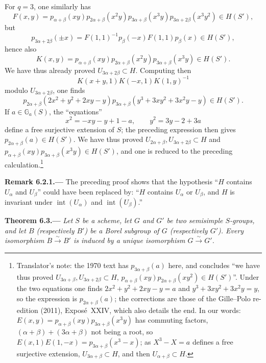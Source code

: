 For \(q=3\), one similarly has
\[
 F(x,y)=
 p_{\alpha+\beta}(xy)
 p_{2\alpha+\beta}(x^2y)
 p_{3\alpha+\beta}(x^3y)
 p_{3\alpha+2\beta}(x^3y^2)\in H(S'),
\]
but
\[
 p_{3\alpha+2\beta}(\pm x)
 =F(1,1)^{-1}p_\beta(-x)F(1,1)p_\beta(x)\in H(S'),
\]
hence also
\[
 K(x,y)=
 p_{\alpha+\beta}(xy)
 p_{2\alpha+\beta}(x^2y)
 p_{3\alpha+\beta}(x^3y)\in H(S').
\]
We have thus already proved \(U_{3\alpha+2\beta}\subset H\). Computing then
\[
 K(x+y,1)K(-x,1)K(1,y)^{-1}
\]
modulo \(U_{3\alpha+2\beta}\), one finds
\[
 p_{2\alpha+\beta}(2x^2+y^2+2xy-y)
 p_{3\alpha+\beta}(y^3+3xy^2+3x^2y-y)\in H(S').
\]
If \(a\in\mathbb G_a(S)\), the ``equations''
\[
  x^2=-xy-y+1-a,\qquad
  y^2=3y-2+3a
\]
define a free surjective extension of \(S\); the preceding expression then gives
\(p_{2\alpha+\beta}(a)\in H(S')\). We have thus proved \(U_{2\alpha+\beta},U_{3\alpha+2\beta}\subset H\)
and \(p_{\alpha+\beta}(xy)p_{3\alpha+\beta}(x^3y)\in H(S')\), and one is reduced to the preceding
calculation.\footnote{Translator's note: the 1970 text has \(p_{3\alpha+\beta}(a)\) here, and
concludes ``we have thus proved \(U_{3\alpha+\beta},U_{3\alpha+2\beta}\subset H\),
\(p_{\alpha+\beta}(xy)p_{2\alpha+\beta}(xy^2)\in H(S')\)''. Under the two equations one finds
\(2x^2+y^2+2xy-y=a\) and \(y^3+3xy^2+3x^2y=y\), so the expression is
\(p_{2\alpha+\beta}(a)\); the corrections are those of the Gille--Polo re-edition (2011),
Exposé~XXIV, which also details the end. In our words: \(E(x,y)=p_{\alpha+\beta}(xy)p_{3\alpha+\beta}(x^3y)\)
has commuting factors, \((\alpha+\beta)+(3\alpha+\beta)\) not being a root, so
\(E(x,1)E(1,-x)=p_{3\alpha+\beta}(x^3-x)\); as \(X^3-X=a\) defines a free surjective extension,
\(U_{3\alpha+\beta}\subset H\), and then \(U_{\alpha+\beta}\subset H\).}

\par\medskip\noindent{}\textbf{Remark 6.2.1.---}\enspace
The preceding proof shows that the hypothesis
``\(H\) contains \(U_\alpha\) and \(U_\beta\)'' could have been
replaced by: ``\(H\) contains \(U_\alpha\) or \(U_\beta\), and \(H\)
is invariant under \(\operatorname{int}(U_\alpha)\) and
\(\operatorname{int}(U_\beta)\).''

\par\medskip\noindent{}\textbf{Theorem 6.3.---}\enspace
\emph{Let \(S\) be a scheme, let \(G\) and \(G'\) be two semisimple
\(S\)-groups, and let \(B\) (respectively \(B'\)) be a Borel subgroup
of \(G\) (respectively \(G'\)).  Every isomorphism
\(B\xrightarrow{\sim}B'\) is induced by a unique isomorphism
\(G\xrightarrow{\sim}G'\).}

